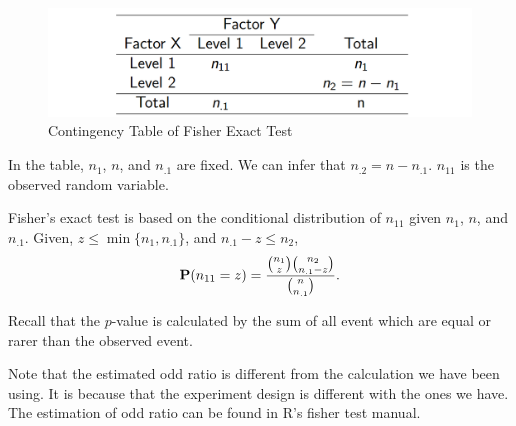 \begin{figure}[H]
	\centering
	\includegraphics[width=0.7\linewidth]{fig/screenshot006}
	\caption{Contingency Table of Fisher Exact Test}
	\label{fig:screenshot006}
\end{figure}

In the table, $n_1$, $n$, and $n_{.1}$ are fixed. We can infer that $n_{.2} = n - n_{.1}$. $n_{11}$ is the observed random variable.

Fisher's exact test is based on the conditional distribution of $n_{11}$ given $n_1$, $n$, and $n_{.1}$. Given, $z \le \min\{n_1, n_{.1}\}$, and $n_{.1} - z \le n_2$,
\[\P(n_{11} = z) = \frac{{n_1 \choose z} {n_2 \choose n_{.1} - z}}{{n \choose n_{.1}}}.\]

Recall that the $p$-value is calculated by the sum of all event which are equal or rarer than the observed event.

Note that the estimated odd ratio is different from the calculation we have been using. It is because that the experiment design is different with the ones we have. The estimation of odd ratio can be found in R's fisher test manual.

